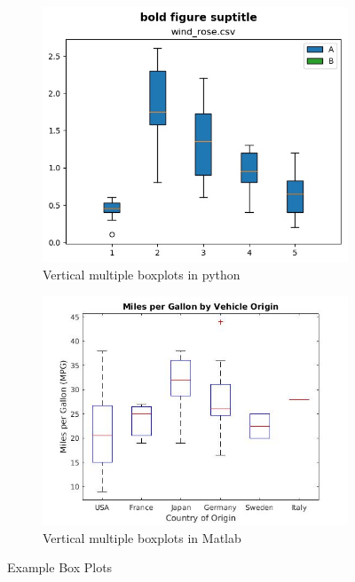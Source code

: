 \documentclass[12pt, a4paper,oneside]{report}
\begin{document}
\begin{figure}
	\begin{subfigure}{.5\textwidth}
		\centering
		\includegraphics[width=.8\linewidth]{box1}
		\caption{Vertical multiple boxplots in python}
		\label{fig:sfig3}
	\end{subfigure}%
	\begin{subfigure}{.5\textwidth}
		\centering
		\includegraphics[width=.8\linewidth]{box2}
		\caption{Vertical multiple boxplots in Matlab}
		\label{fig:sfig3}
	\end{subfigure}
	\caption{Example Box Plots}
	\label{fig:figbox}
\end{figure}




\end{document}
